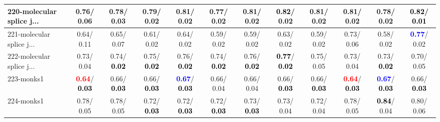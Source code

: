\begin{table}[h]
\begin{center}
{\begin{tabular}{lc|c|c|c|c|c|c|c|c|c|c}
220-molecular splice j... &   0.76/  0.06 &   0.78/  0.03 &   0.79/  0.02 &   0.81/  0.02 &   0.77/  0.02 &   0.81/  0.02 & \textcolor{black}{\textbf{  0.82}}/  0.02 &   0.81/  0.02 &   0.81/  0.02 &   0.78/  0.02 & \textcolor{black}{\textbf{  0.82}}/\textcolor{black}{\textbf{  0.01}} \\ \hline
221-molecular splice j... &   0.64/  0.11 &   0.65/  0.07 &   0.61/  0.02 &   0.64/  0.02 &   0.59/  0.02 &   0.59/  0.02 &   0.63/  0.02 &   0.59/  0.02 &   0.73/  0.06 &   0.58/  0.02 & \textcolor{blue}{\textbf{  0.77}}/  0.02 \\
222-molecular splice j... &   0.73/  0.04 &   0.74/\textcolor{black}{\textbf{  0.02}} &   0.75/\textcolor{black}{\textbf{  0.02}} &   0.76/\textcolor{black}{\textbf{  0.02}} &   0.74/\textcolor{black}{\textbf{  0.02}} &   0.76/\textcolor{black}{\textbf{  0.02}} & \textcolor{black}{\textbf{  0.77}}/\textcolor{black}{\textbf{  0.02}} &   0.75/  0.05 &   0.73/  0.04 &   0.73/\textcolor{black}{\textbf{  0.02}} &   0.70/  0.05 \\
223-monks1 & \textcolor{red}{\textbf{  0.64}}/\textcolor{black}{\textbf{  0.03}} &   0.66/\textcolor{black}{\textbf{  0.03}} &   0.66/\textcolor{black}{\textbf{  0.03}} & \textcolor{blue}{\textbf{  0.67}}/\textcolor{black}{\textbf{  0.03}} &   0.66/  0.04 &   0.66/  0.04 &   0.66/\textcolor{black}{\textbf{  0.03}} &   0.66/\textcolor{black}{\textbf{  0.03}} & \textcolor{red}{\textbf{  0.64}}/\textcolor{black}{\textbf{  0.03}} & \textcolor{blue}{\textbf{  0.67}}/\textcolor{black}{\textbf{  0.03}} &   0.66/\textcolor{black}{\textbf{  0.03}} \\
224-monks1 &   0.78/  0.05 &   0.78/  0.05 &   0.72/\textcolor{black}{\textbf{  0.03}} &   0.72/\textcolor{black}{\textbf{  0.03}} &   0.72/\textcolor{black}{\textbf{  0.03}} &   0.73/\textcolor{black}{\textbf{  0.03}} &   0.73/  0.04 &   0.72/  0.04 &   0.78/  0.05 & \textcolor{black}{\textbf{  0.84}}/  0.04 &   0.80/  0.06 \\\end{tabular}}\label{stratsALCKappa6Allalla}
\end{center}
\end{table}
